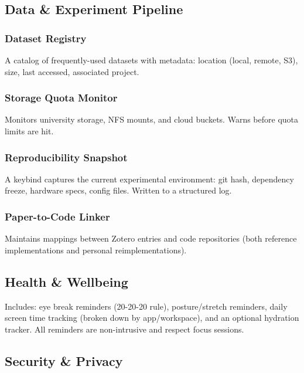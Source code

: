 \documentclass[11pt,a4paper]{article}
\begin{document}
\subsection{Data \& Experiment Pipeline}
\label{sec:features-data}

\subsubsection{Dataset Registry}
A catalog of frequently-used datasets with metadata: location (local, remote, S3), size, last accessed, associated project.

\subsubsection{Storage Quota Monitor}
Monitors university storage, NFS mounts, and cloud buckets. Warns before quota limits are hit.

\subsubsection{Reproducibility Snapshot}
A keybind captures the current experimental environment: git hash, dependency freeze, hardware specs, config files. Written to a structured log.

\subsubsection{Paper-to-Code Linker}
Maintains mappings between Zotero entries and code repositories (both reference implementations and personal reimplementations).


\subsection{Health \& Wellbeing}
\label{sec:features-health}

Includes: eye break reminders (20-20-20 rule), posture/stretch reminders, daily screen time tracking (broken down by app/workspace), and an optional hydration tracker. All reminders are non-intrusive and respect focus sessions.


\subsection{Security \& Privacy}
\label{sec:features-security}
\end{document}
